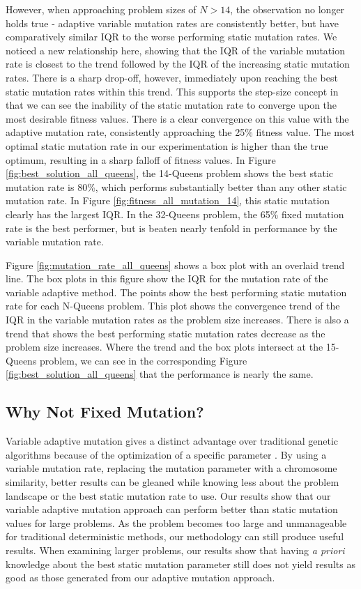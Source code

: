 \documentclass{sig-alternate}
\begin{document}
However, when approaching problem sizes of $N > 14$, the observation no longer holds true - adaptive variable mutation rates are consistently better, but have comparatively similar IQR to the worse performing static mutation rates. We noticed a new relationship here, showing that the IQR of the variable mutation rate is closest to the trend followed by the IQR of the increasing static mutation rates. There is a sharp drop-off, however, immediately upon reaching the best static mutation rates within this trend. This supports the step-size concept in that we can see the inability of the static mutation rate to converge upon the most desirable fitness values. There is a clear convergence on this value with the adaptive mutation rate, consistently approaching the 25\% fitness value. The most optimal static mutation rate in our experimentation is higher than the true optimum, resulting in a sharp falloff of fitness values. In Figure \ref{fig:best_solution_all_queens}, the 14-Queens problem shows the best static mutation rate is 80\%, which performs substantially better than any other static mutation rate. In Figure \ref{fig:fitness_all_mutation_14}, this static mutation clearly has the largest IQR. In the 32-Queens problem, the 65\% fixed mutation rate is the best performer, but is beaten nearly tenfold in performance by the variable mutation rate.

Figure \ref{fig:mutation_rate_all_queens} shows a box plot with an overlaid trend line. The box plots in this figure show the IQR for the mutation rate of the variable adaptive method. The points show the best performing static mutation rate for each N-Queens problem. This plot shows the convergence trend of the IQR in the variable mutation rates as the problem size increases. There is also a trend that shows the best performing static mutation rates decrease as the problem size increases. Where the trend and the box plots intersect at the 15-Queens problem, we can see in the corresponding Figure \ref{fig:best_solution_all_queens} that the performance is nearly the same.

\subsection{Why Not Fixed Mutation?}
Variable adaptive mutation gives a distinct advantage over traditional genetic algorithms because of the optimization of a specific parameter \cite{hesser1991towards,ye2010some}. By using a variable mutation rate, replacing the mutation parameter with a chromosome similarity, better results can be gleaned while knowing less about the problem landscape or the best static mutation rate to use. Our results show that our variable adaptive mutation approach can perform better than static mutation values for large problems. As the problem becomes too large and unmanageable for traditional deterministic methods, our methodology can still produce useful results. When examining larger problems, our results show that having \emph{a priori} knowledge about the best static mutation parameter still does not yield results as good as those generated from our adaptive mutation approach.
\end{document}
